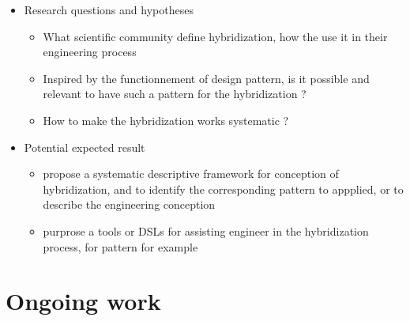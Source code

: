 \documentclass[
]{article}
\providecommand{\tightlist}{%
  \setlength{\itemsep}{0pt}\setlength{\parskip}{0pt}}
\begin{document}
\begin{itemize}
\tightlist
\item
  Research questions and hypotheses

  \begin{itemize}
  \tightlist
  \item
    What scientific community define hybridization, how the use it in
    their engineering process
  \item
    Inspired by the functionnement of design pattern, is it possible and
    relevant to have such a pattern for the hybridization ?
  \item
    How to make the hybridization works systematic ?
  \end{itemize}
\item
  Potential expected result

  \begin{itemize}
  \tightlist
  \item
    propose a systematic descriptive framework for conception of
    hybridization, and to identify the corresponding pattern to
    appplied, or to describe the engineering conception
  \item
    purprose a tools or DSLs for assisting engineer in the hybridization
    process, for pattern for example
  \end{itemize}
\end{itemize}

\section{Ongoing work}\label{ongoing-work}
\end{document}
